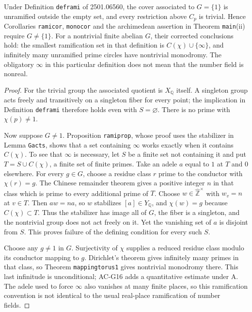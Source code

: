 \begin{proposition}
\label{AC-G17}
Under Definition \texttt{deframi} of 2501.06560, the cover associated
to $G=\{1\}$ is unramified outside the empty set, and every
restriction above $C_p$ is trivial.  Hence Corollaries
\texttt{ramicor}, \texttt{monocor} and the archimedean assertion in
Theorem \texttt{main}(ii) require $G\ne\{1\}$.
For a nontrivial finite abelian $G$, their corrected conclusions hold:
the smallest ramification set in that definition is
$C(\chi)\cup\{\infty\}$, and infinitely many unramified prime circles
have nontrivial monodromy.  The obligatory $\infty$ in this particular
definition does not mean that the number field is nonreal.
\end{proposition}
\begin{proof}
For the trivial group the associated quotient is $X_{\mathbb Q}$
itself.  A singleton group acts freely and transitively on a singleton
fiber for every point; the implication in Definition
\texttt{deframi} therefore holds even with $S=\varnothing$.
There is no prime with $\chi(p)\ne1$.

Now suppose $G\ne1$.  Proposition \texttt{ramiprop}, whose proof uses
the stabilizer in Lemma \texttt{Gacts}, shows that a set containing
$\infty$ works exactly when it contains $C(\chi)$.  To see that
$\infty$ is necessary, let $S$ be a finite set not containing it and
put $T=S\cup C(\chi)$, a finite set of finite primes.  Take an adele
$a$ equal to $1$ at $T$ and $0$ elsewhere.  For every
$g\in G$, choose a residue class $r$ prime to the conductor with
$\chi(r)=g$.  The Chinese remainder theorem gives a positive integer
$n$ in that class which is prime to every additional prime of $T$.
Choose $w\in\widehat{\mathbb Z}^\times$ with $w_v=n$ at $v\in T$.
Then $aw=na$, so $w$ stabilizes $[a]\in Y_{\mathbb Q}$, and
$\chi(w)=g$ because $C(\chi)\subset T$.
Thus the stabilizer has image all of $G$, the fiber is a singleton,
and the nontrivial group does not act freely on it.  Yet the vanishing
set of $a$ is disjoint from $S$.  This proves failure of the defining
condition for every such $S$.

Choose any $g\ne1$ in $G$.  Surjectivity of $\chi$ supplies a reduced
residue class modulo its conductor mapping to $g$.  Dirichlet's
theorem gives infinitely many primes in that class, so Theorem
\texttt{mappingtorus1} gives nontrivial monodromy there.  This last
infinitude is unconditional; AC-G16 adds a quantitative estimate
under A.  The adele used to force $\infty$ also vanishes at many finite
places, so this ramification convention is not identical to the usual
real-place ramification of number fields.
\end{proof}

